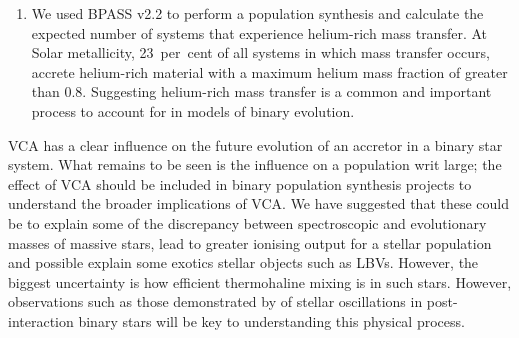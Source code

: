 \begin{enumerate}
    \item We used BPASS v2.2 to perform a population synthesis and calculate the expected number of systems that experience helium-rich mass transfer. At Solar metallicity, 23~per~cent of all systems in which mass transfer occurs, accrete helium-rich material with a maximum helium mass fraction of greater than 0.8. Suggesting helium-rich mass transfer is a common and important process to account for in models of binary evolution.
\end{enumerate}

VCA has a clear influence on the future evolution of an accretor in a binary star system. What remains to be seen is the influence on a population writ large; the effect of VCA should be included in binary population synthesis projects to understand the broader implications of VCA. We have suggested that these could be to explain some of the discrepancy between spectroscopic and evolutionary masses of massive stars, lead to greater ionising output for a stellar population and possible explain some exotics stellar objects such as LBVs. However, the biggest uncertainty is how efficient thermohaline mixing is in such stars. However, observations such as those demonstrated by \citet{Miszuda:2021} of stellar oscillations in post-interaction binary stars will be key to understanding this physical process.